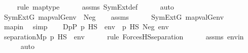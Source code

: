 \begin{isabellebody}
\ \ \ \ \isamarkupfalse%
{\isacharparenleft}{\kern0pt}rule\ map{\isacharunderscore}{\kern0pt}type{\isacharparenright}{\kern0pt}\isanewline
\ \ \ \ \isamarkupfalse%
\ assms\ SymExt{\isacharunderscore}{\kern0pt}def\isanewline
\ \ \ \ \isamarkupfalse%
\ auto\isanewline
\isanewline
\ \ \isamarkupfalse%
\ {\isachardoublequoteopen}SymExt{\isacharparenleft}{\kern0pt}G{\isacharparenright}{\kern0pt}{\isacharcomma}{\kern0pt}\ map{\isacharparenleft}{\kern0pt}val{\isacharparenleft}{\kern0pt}G{\isacharparenright}{\kern0pt}{\isacharcomma}{\kern0pt}env{\isacharparenright}{\kern0pt}\ {\isasymTurnstile}\ Neg{\isacharparenleft}{\kern0pt}{\isasymphi}{\isacharparenright}{\kern0pt}{\isachardoublequoteclose}\isanewline
\ \ \isamarkupfalse%
\ assms\ \isanewline
\ \ \isamarkupfalse%
\ {\isachardoublequoteopen}{\isasymnot}\ {\isacharparenleft}{\kern0pt}SymExt{\isacharparenleft}{\kern0pt}G{\isacharparenright}{\kern0pt}{\isacharcomma}{\kern0pt}\ map{\isacharparenleft}{\kern0pt}val{\isacharparenleft}{\kern0pt}G{\isacharparenright}{\kern0pt}{\isacharcomma}{\kern0pt}env{\isacharparenright}{\kern0pt}\ {\isasymTurnstile}\ {\isasymphi}{\isacharparenright}{\kern0pt}{\isachardoublequoteclose}\isanewline
\ \ \ \ \isamarkupfalse%
\ mapin\ \isamarkupfalse%
\ simp\isanewline
\ \ \isamarkupfalse%
\ {\isacharquery}{\kern0pt}D{\isacharequal}{\kern0pt}{\isachardoublequoteopen}{\isacharbraceleft}{\kern0pt}p{\isasymin}P{\isachardot}{\kern0pt}\ {\isacharparenleft}{\kern0pt}p\ {\isasymtturnstile}HS\ {\isasymphi}\ env{\isacharparenright}{\kern0pt}\ {\isasymor}\ {\isacharparenleft}{\kern0pt}p\ {\isasymtturnstile}HS\ Neg{\isacharparenleft}{\kern0pt}{\isasymphi}{\isacharparenright}{\kern0pt}\ env{\isacharparenright}{\kern0pt}{\isacharbraceright}{\kern0pt}{\isachardoublequoteclose}\isanewline
\ \ \isamarkupfalse%
\ {\isachardoublequoteopen}separation{\isacharparenleft}{\kern0pt}{\isacharhash}{\kern0pt}{\isacharhash}{\kern0pt}M{\isacharcomma}{\kern0pt}{\isasymlambda}p{\isachardot}{\kern0pt}\ {\isacharparenleft}{\kern0pt}p\ {\isasymtturnstile}HS\ {\isasymphi}\ env{\isacharparenright}{\kern0pt}{\isacharparenright}{\kern0pt}{\isachardoublequoteclose}\ \isanewline
\ \ \ \ \isamarkupfalse%
{\isacharparenleft}{\kern0pt}rule\ ForcesHS{\isacharunderscore}{\kern0pt}separation{\isacharparenright}{\kern0pt}\isanewline
\ \ \ \ \isamarkupfalse%
\ assms\ envin\isanewline
\ \ \ \ \isamarkupfalse%
\ auto\isanewline

\end{isabellebody}
